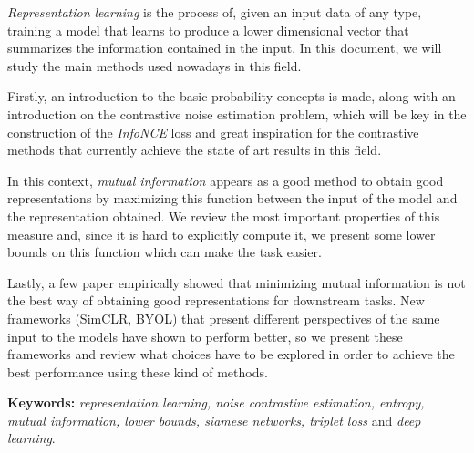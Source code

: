 \emph{Representation learning} is the process of, given an input data of any type, training a model that learns to produce a lower dimensional vector that summarizes the information contained in the input. In this document, we will study the main methods used nowadays in this field.

Firstly, an introduction to the basic probability concepts is made, along with an introduction on the contrastive noise estimation problem, which will be key in the construction of the \emph{InfoNCE} loss and great inspiration for the contrastive methods that currently achieve the state of art results in this field.

In this context, \emph{mutual information} appears as a good method to obtain good representations by maximizing this function between the input of the model and the representation obtained. We review the most important properties of this measure and, since it is hard to explicitly compute it, we present some lower bounds on this function which can make the task easier.

Lastly, a few paper empirically showed that minimizing mutual information is not the best way of obtaining good representations for downstream tasks. New frameworks (SimCLR, BYOL) that present different perspectives of the same input to the models have shown to perform better, so we present these frameworks and review what choices have to be explored in order to achieve the best performance using these kind of methods.




\textbf{Keywords:} \emph{representation learning, noise contrastive estimation, entropy, mutual information, lower bounds, siamese networks, triplet loss} and \emph{deep learning}.